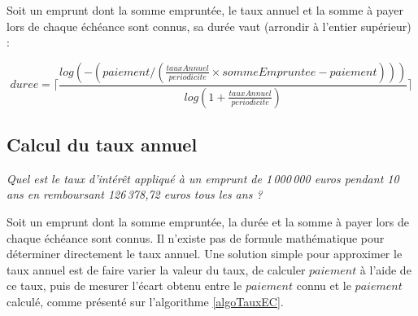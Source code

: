 \documentclass[11pt,a4paper]{scrartcl}
\begin{document}
Soit un emprunt dont la somme empruntée, le taux annuel et la somme à payer lors de chaque échéance sont connus, sa durée vaut (arrondir à l'entier supérieur) :


\begin{equation}
	duree=\lceil\frac{log(-(paiement/(\frac{tauxAnnuel}{periodicite}\times sommeEmpruntee-paiement)))}{log(1+\frac{tauxAnnuel}{periodicite})}\rceil
\end{equation} 
	



\subsection{Calcul du taux annuel}
\emph{Quel est le taux d'intérêt appliqué à un emprunt de 1\,000\,000 euros pendant 10 ans en remboursant 126\,378,72 euros tous les ans ?}

Soit un emprunt dont la somme empruntée, la durée et la somme à payer lors de chaque échéance sont connus. Il n'existe pas de formule mathématique pour déterminer directement le taux annuel. Une solution simple pour approximer le taux annuel est de faire varier la valeur du taux, de calculer $paiement$ à l'aide de ce taux, puis de mesurer l'écart obtenu entre le $paiement$ connu et le $paiement$ calculé, comme présenté sur l'algorithme \ref{algoTauxEC}.
\end{document}
